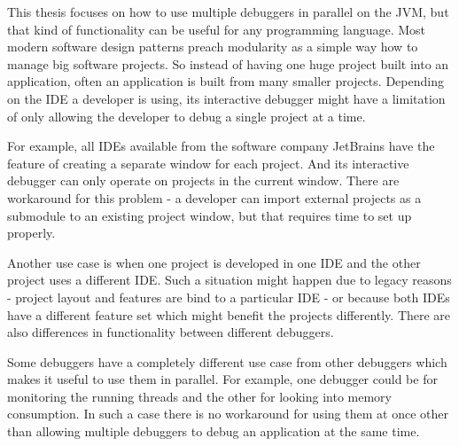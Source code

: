 \documentclass[..thesis.tex]{subfiles}
\begin{document}
This thesis focuses on how to use multiple debuggers in parallel on the JVM, but that kind of functionality can be useful for any programming language. 
Most modern software design patterns preach modularity as a simple way how to manage big software projects.
So instead of having one huge project built into an application, often an application is built from many smaller projects.
Depending on the IDE a developer is using, its interactive debugger might have a limitation of only allowing the developer to debug a single project at a time.

For example, all IDEs available from the software company JetBrains have the feature of creating a separate window for each project.
And its interactive debugger can only operate on projects in the current window.
There are workaround for this problem - a developer can import external projects as a submodule to an existing project window, but that requires time to set up properly.

Another use case is when one project is developed in one IDE and the other project uses a different IDE.
Such a situation might happen due to legacy reasons - project layout and features are bind to a particular IDE - or because both IDEs have a different feature set which might benefit the projects differently.
There are also differences in functionality between different debuggers. 

Some debuggers have a completely different use case from other debuggers which makes it useful to use them in parallel.
For example, one debugger could be for monitoring the running threads and the other for looking into memory consumption.
In such a case there is no workaround for using them at once other than allowing multiple debuggers to debug an application at the same time.
\end{document}
